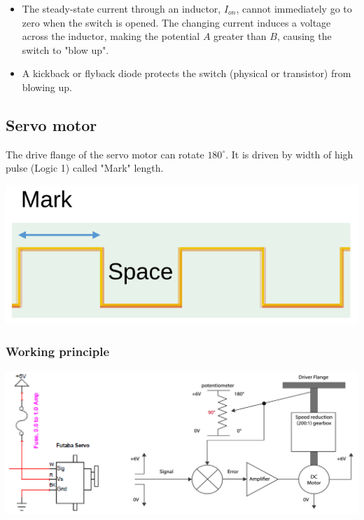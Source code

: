 \documentclass[11pt]{article}
\begin{document}
\begin{itemize}
\item The steady-state current through an inductor, \(I_{on}\), cannot immediately go to zero when the switch is opened. The changing current induces a voltage across the inductor, making the potential \(A\) greater than \(B\), causing the switch to "blow up".
\item A kickback or flyback diode protects the switch (physical or transistor) from blowing up.
\end{itemize}

\subsection{Servo motor}
\label{sec:org370fe13}
The drive flange of the servo motor can rotate \(180^{\circ}\). It is driven by width of high pulse (Logic 1) called "Mark" length.

\begin{center}
\includegraphics[scale=0.6]{./images/servo-motor-mark-length.png}
\end{center}

\subsubsection{Working principle}
\label{sec:org2dc4fd6}
\begin{center}
\includegraphics[width=.9\linewidth]{./images/servo-motor-working-principle.png}
\end{center}
\end{document}
